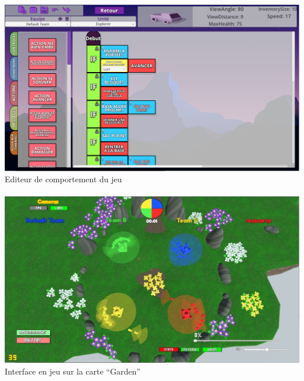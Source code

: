 \documentclass{report}
\begin{document}
\paragraph{}

\paragraph{}
\begin{adjustwidth}{-3em}{-3em}
\begin{center}
\includegraphics[scale=0.5]{DATA/editeurcomportement.png}
 {Editeur de comportement du jeu}
\end{center}
\end{adjustwidth}
\paragraph{}


\paragraph{}
\begin{adjustwidth}{-3em}{-3em}
\begin{center}
\includegraphics[scale=0.3]{DATA/enjeu.png}
 {Interface en jeu sur la carte “Garden”}
\end{center}
\end{adjustwidth}
\end{document}
